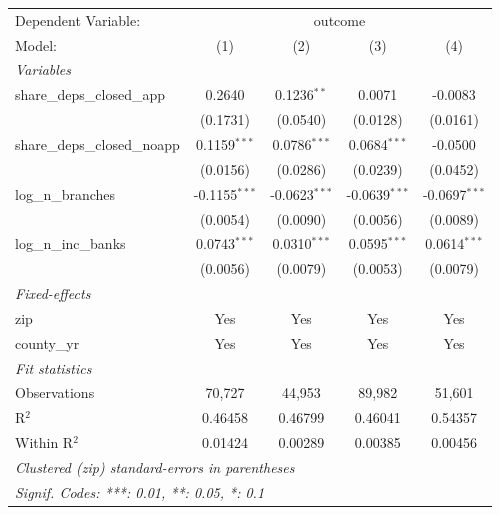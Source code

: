 \begingroup
\centering
\begin{tabular}{lcccc}
   \tabularnewline \midrule \midrule
   Dependent Variable: & \multicolumn{4}{c}{outcome}\\
   Model:                        & (1)             & (2)             & (3)             & (4)\\  
   \midrule
   \emph{Variables}\\
   share\_deps\_closed\_app      & 0.2640          & 0.1236$^{**}$   & 0.0071          & -0.0083\\   
                                 & (0.1731)        & (0.0540)        & (0.0128)        & (0.0161)\\   
   share\_deps\_closed\_noapp    & 0.1159$^{***}$  & 0.0786$^{***}$  & 0.0684$^{***}$  & -0.0500\\   
                                 & (0.0156)        & (0.0286)        & (0.0239)        & (0.0452)\\   
   log\_n\_branches              & -0.1155$^{***}$ & -0.0623$^{***}$ & -0.0639$^{***}$ & -0.0697$^{***}$\\   
                                 & (0.0054)        & (0.0090)        & (0.0056)        & (0.0089)\\   
   log\_n\_inc\_banks            & 0.0743$^{***}$  & 0.0310$^{***}$  & 0.0595$^{***}$  & 0.0614$^{***}$\\   
                                 & (0.0056)        & (0.0079)        & (0.0053)        & (0.0079)\\   
   \midrule
   \emph{Fixed-effects}\\
   zip                           & Yes             & Yes             & Yes             & Yes\\  
   county\_yr                    & Yes             & Yes             & Yes             & Yes\\  
   \midrule
   \emph{Fit statistics}\\
   Observations                  & 70,727          & 44,953          & 89,982          & 51,601\\  
   R$^2$                         & 0.46458         & 0.46799         & 0.46041         & 0.54357\\  
   Within R$^2$                  & 0.01424         & 0.00289         & 0.00385         & 0.00456\\  
   \midrule \midrule
   \multicolumn{5}{l}{\emph{Clustered (zip) standard-errors in parentheses}}\\
   \multicolumn{5}{l}{\emph{Signif. Codes: ***: 0.01, **: 0.05, *: 0.1}}\\
\end{tabular}
\par\endgroup
